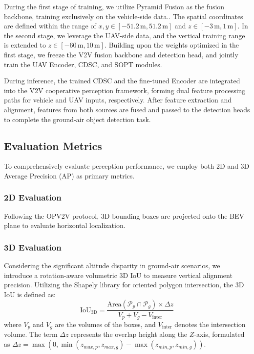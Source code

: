 \documentclass[conference]{IEEEtran}
\begin{document}
During the first stage of training, we utilize Pyramid Fusion as the fusion backbone, training exclusively on the vehicle-side data.. The spatial coordinates are defined within the range of $x, y \in [-51.2\,\text{m}, 51.2\,\text{m}]$ and $z \in [-3\,\text{m}, 1\,\text{m}]$. In the second stage, we leverage the UAV-side data, and the vertical training range is extended to $z \in [-60\,\text{m}, 10\,\text{m}]$. Building upon the weights optimized in the first stage, we freeze the V2V fusion backbone and detection head, and jointly train the UAV Encoder, CDSC, and SOPT modules. 

During inference, the trained CDSC and the fine-tuned Encoder are integrated into the V2V cooperative perception framework, forming dual feature processing paths for vehicle and UAV inputs, respectively. After feature extraction and alignment, features from both sources are fused and passed to the detection heads to complete the ground-air object detection task.


\subsection{Evaluation Metrics}To comprehensively evaluate perception performance, we employ both 2D and 3D Average Precision (AP) as primary metrics.
\subsubsection{2D Evaluation}
Following the OPV2V \cite{xu2022opv2v} protocol, 3D bounding boxes are projected onto the BEV plane to evaluate horizontal localization.
\subsubsection{3D Evaluation}
Considering the significant altitude disparity in ground-air scenarios, we introduce a rotation-aware volumetric 3D IoU to measure vertical alignment precision. Utilizing the Shapely library for oriented polygon intersection, the 3D IoU is defined as:
\begin{equation}
\text{IoU}_{\text{3D}} = \frac{\text{Area}(\mathcal{P}_p \cap \mathcal{P}_g) \times \Delta z}{V_p + V_g - V_{\text{inter}}}
\end{equation}
where $V_p$ and $V_g$ are the volumes of the boxes, and $V_{\text{inter}}$ denotes the intersection volume. The term $\Delta z$ represents the overlap height along the $Z$-axis, formulated as $\Delta z = \max(0, \min(z_{max,p}, z_{max,g}) - \max(z_{min,p}, z_{min,g}))$.
\end{document}
